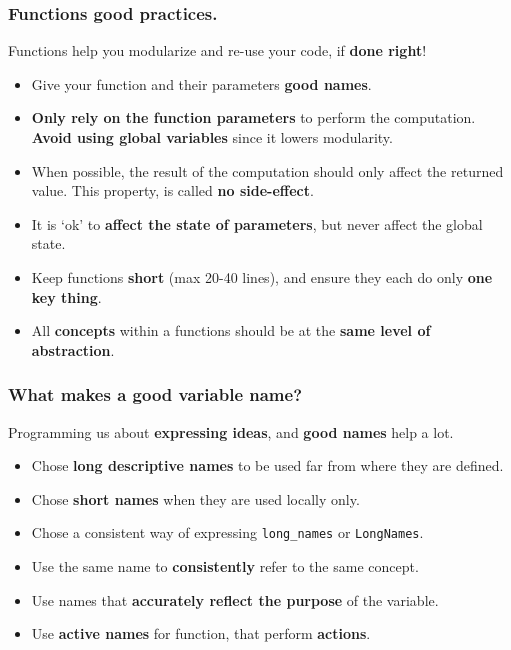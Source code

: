 \documentclass{beamer} %
\newcommand\emc[1]{\textcolor{brightblue}{\textbf{#1}}}
\begin{document}
\begin{frame}
\frametitle{Functions good practices.}

Functions help you modularize and re-use your code, if \emc{done right}!
\begin{itemize}
	\item Give your function and their parameters \emc{good names}.
	\item \emc{Only rely on the function parameters} to perform the computation. \emc{Avoid using global variables} since it lowers modularity.
	\item When possible, the result of the computation should only affect the returned value. This property, is called \emc{no side-effect}.
	\item It is `ok' to \emc{affect the state of parameters}, but never affect the global state.
	\item Keep functions \emc{short} (max 20-40 lines), and ensure they each do only \emc{one key thing}. 
	\item All \emc{concepts} within a functions should be at the \emc{same level of abstraction}.
\end{itemize}

\end{frame}

\begin{frame}
\frametitle{What makes a good variable name?}

Programming us about \emc{expressing ideas}, and \emc{good names} help a lot.

\begin{itemize}
	\item Chose \emc{long descriptive names} to be used far from where they are defined.
	\item Chose \emc{short names} when they are used locally only.
	\item Chose a consistent way of expressing \texttt{long\_names} or \texttt{LongNames}.
	\item Use the same name to \emc{consistently} refer to the same concept.
	\item Use names that \emc{accurately reflect the purpose} of the variable.
	\item Use \emc{active names} for function, that perform \emc{actions}.
\end{itemize}

\end{frame}




\end{document}
